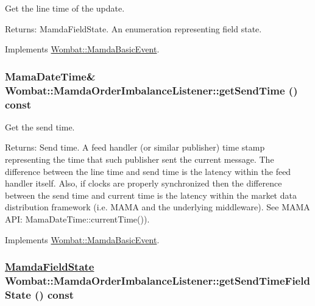 Get the line time of the update. 

\begin{Desc}
\item[Returns:]Mamda\-Field\-State. An enumeration representing field state. \end{Desc}


Implements \hyperlink{classWombat_1_1MamdaBasicEvent_eb06352aca3280c5e89bad7a3b185cdf}{Wombat::Mamda\-Basic\-Event}.\hypertarget{classWombat_1_1MamdaOrderImbalanceListener_ccbfe5ac89809e35624d42faa0c40a1b}{
\subsubsection[getSendTime]{\setlength{\rightskip}{0pt plus 5cm}Mama\-Date\-Time\& Wombat::Mamda\-Order\-Imbalance\-Listener::get\-Send\-Time () const}}
\label{classWombat_1_1MamdaOrderImbalanceListener_ccbfe5ac89809e35624d42faa0c40a1b}


Get the send time. 

\begin{Desc}
\item[Returns:]Send time. A feed handler (or similar publisher) time stamp representing the time that such publisher sent the current message. The difference between the line time and send time is the latency within the feed handler itself. Also, if clocks are properly synchronized then the difference between the send time and current time is the latency within the market data distribution framework (i.e. MAMA and the underlying middleware). See MAMA API: Mama\-Date\-Time::current\-Time()). \end{Desc}


Implements \hyperlink{classWombat_1_1MamdaBasicEvent_b0602a83bec20cd8b341ec866ff3bffa}{Wombat::Mamda\-Basic\-Event}.\hypertarget{classWombat_1_1MamdaOrderImbalanceListener_938d4210b58560bf6ee8cb155546a3d8}{
\subsubsection[getSendTimeFieldState]{\setlength{\rightskip}{0pt plus 5cm}\hyperlink{namespaceWombat_93aac974f2ab713554fd12a1fa3b7d2a}{Mamda\-Field\-State} Wombat::Mamda\-Order\-Imbalance\-Listener::get\-Send\-Time\-Field\-State () const}}
\label{classWombat_1_1MamdaOrderImbalanceListener_938d4210b58560bf6ee8cb155546a3d8}


